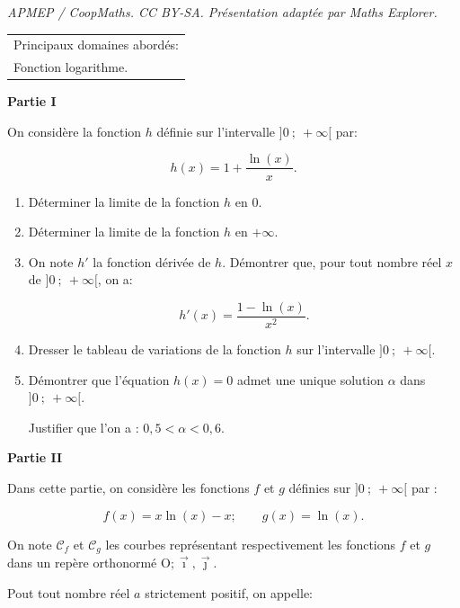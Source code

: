 \documentclass[10pt]{article}
\providecommand{\Oij}{\(\mathrm{O};\vec{\imath},\vec{\jmath}\)}
\begin{document}
\noindent\textit{APMEP / CoopMaths. CC BY-SA. Présentation adaptée par Maths Explorer.}\par\medskip
\medskip

\begin{tabular}{|l|}\hline
Principaux domaines abordés:\\
Fonction logarithme.\\ \hline
\end{tabular}

\bigskip

\textbf{Partie I}

\medskip

On considère la fonction $h$ définie sur l'intervalle $]0~;~ +\infty[$ par:

\[h(x) = 1 + \dfrac{\ln (x)}{x}.\]

\smallskip

\begin{enumerate}
\item Déterminer la limite de la fonction $h$ en $0$.
\item Déterminer la limite de la fonction $h$ en $+\infty$.
\item On note $h'$ la fonction dérivée de $h$. Démontrer que, pour tout nombre réel $x$ de $]0~;~ +\infty[$, on a:

\[h'(x) = \dfrac{1 - \ln (x)}{x^2}.\]

\smallskip

\item Dresser le tableau de variations de la fonction $h$ sur l'intervalle $]0~;~ +\infty[$.
\item Démontrer que l'équation $h(x) = 0$ admet une unique solution $\alpha$ dans $]0~;~ +\infty[$. 

Justifier que l'on a : $0,5 < \alpha < 0,6$.
\end{enumerate}

\bigskip

\textbf{Partie II}

\medskip

Dans cette partie, on considère les fonctions $f$ et $g$ définies sur $]0~;~ +\infty[$ par : 

\[f(x) = x \ln (x) - x ;\qquad  g(x) = \ln (x).\]

On note $\mathcal{C}_f$ et $\mathcal{C}_g$ les courbes représentant respectivement les fonctions $f$ et $g$ dans un repère orthonormé \Oij.

Pout tout nombre réel $a$ strictement positif, on appelle:
\end{document}
